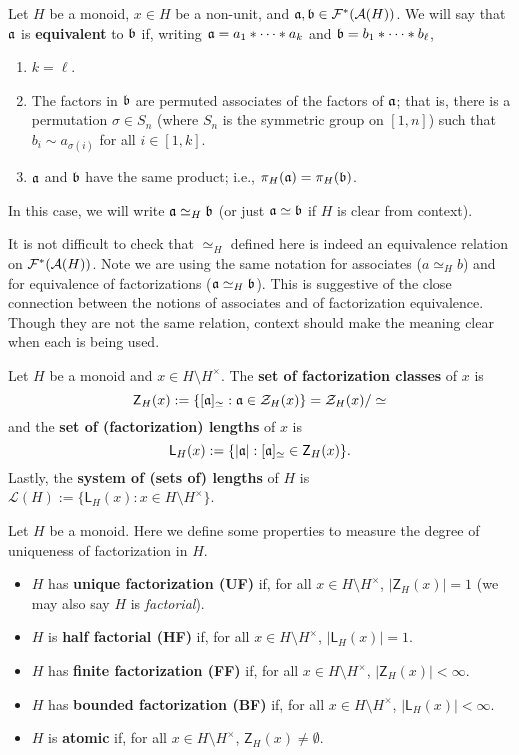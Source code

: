 \begin{defn} \label{def:equivalence}
Let $H$ be a monoid, $x\in H$ be a non-unit, and $\aa,\bb \in \F^*(\A(H))$.
We will say that $\aa$ is \textbf{equivalent} to $\bb$ if, writing $\aa = a_1*\cdots * a_k$ and $\bb = b_1*\cdots * b_\ell$,
\begin{enumerate}
\item $k = \ell$.
\item The factors in $\bb$ are permuted associates of the factors of $\aa$; that is, there is a permutation $\sigma\in S_n$ (where $S_n$ is the symmetric group on $[1,n]$) such that $b_i \sim a_{\sigma(i)}$ for all $i\in [1,k]$.
\item $\aa$ and $\bb$ have the same product; i.e., $\pi_H(\aa) = \pi_H(\bb)$.
\end{enumerate}
In this case, we will write $\aa \simeq_H \bb$ (or just $\aa\simeq\bb$ if $H$ is clear from context).
\end{defn}

It is not difficult to check that $\simeq_H$ defined here is indeed an equivalence relation on $\F^*(\A(H))$.
Note we are using the same notation for associates ($a\simeq_H b$) and for equivalence of factorizations ($\aa\simeq_H\bb$).
This is suggestive of the close connection between the notions of associates and of factorization equivalence.
Though they are not the same relation, context should make the meaning clear when each is being used.  

\begin{defn} \label{def:set of lengths}
Let $H$ be a monoid and $x\in H\setminus H^\times$.
The \textbf{set of factorization classes} of $x$ is
\[ \mathsf{Z}_H(x) := \{ [\aa]_{\simeq}: \aa\in \Z_H(x) \} = \Z_H(x)/\simeq \]
and the \textbf{set of (factorization) lengths} of $x$ is
\[ \mathsf{L}_H(x) := \{ |\aa| : [\aa]_{\simeq} \in \mathsf{Z}_H(x) \}. \]
Lastly, the \textbf{system of (sets of) lengths} of $H$ is $\mathcal{L}(H) := \{\mathsf{L}_H(x): x\in H\setminus H^\times\}$.
\end{defn}

\begin{defn} \label{def:factorization properties}
Let $H$ be a monoid.
Here we define some properties to measure the degree of uniqueness of factorization in $H$.
\begin{itemize}
\item $H$ has \textbf{unique factorization (UF)} if, for all $x\in H\setminus H^\times$, $|\mathsf{Z}_H(x)| = 1$ (we may also say $H$ is \textit{factorial}).
\item $H$ is \textbf{half factorial (HF)} if, for all $x\in H\setminus H^\times$, $|\mathsf{L}_H(x)| = 1$.
\item $H$ has \textbf{finite factorization (FF)} if, for all $x\in H\setminus H^\times$, $|\mathsf{Z}_H(x)| <\infty$.
\item $H$ has \textbf{bounded factorization (BF)} if, for all $x\in H\setminus H^\times$, $|\mathsf{L}_H(x)| < \infty$.
\item $H$ is \textbf{atomic} if, for all $x\in H\setminus H^\times$, $\mathsf{Z}_H(x) \neq \emptyset$.
\end{itemize}
\end{defn}

